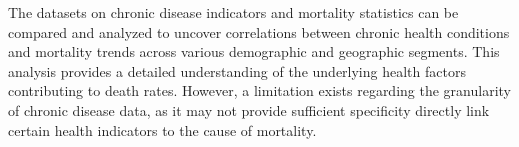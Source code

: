 \documentclass[a4paper,10pt]{article}
\begin{document}
The datasets on chronic disease indicators and mortality statistics can be compared and analyzed to uncover correlations between chronic health conditions and mortality trends across various demographic and geographic segments. This analysis provides a detailed understanding of the underlying health factors contributing to death rates. However, a limitation exists regarding the granularity of chronic disease data, as it may not provide sufficient specificity directly link certain health indicators to the cause of mortality.



\newpage


\end{document}
